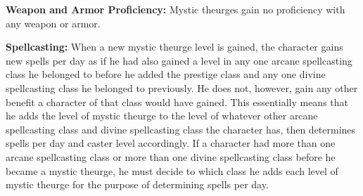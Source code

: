 {
\textbf{Weapon and Armor Proficiency:} Mystic theurges gain no proficiency with any weapon or armor.

\textbf{Spellcasting:} When a new mystic theurge level is gained, the character gains new spells per day as if he had also gained a level in any one arcane spellcasting class he belonged to before he added the prestige class and any one divine spellcasting class he belonged to previously. He does not, however, gain any other benefit a character of that class would have gained. This essentially means that he adds the level of mystic theurge to the level of whatever other arcane spellcasting class and divine spellcasting class the character has, then determines spells per day and caster level accordingly. If a character had more than one arcane spellcasting class or more than one divine spellcasting class before he became a mystic theurge, he must decide to which class he adds each level of mystic theurge for the purpose of determining spells per day.
}

